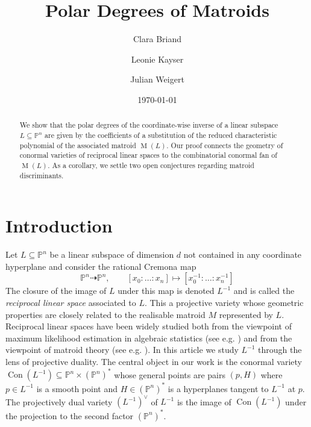 \documentclass[12pt,a4paper,english]{scrartcl}
\title{Polar Degrees of Matroids}
\author{Clara Briand}
\author{Leonie Kayser}
\author{Julian Weigert}
\date{\today}
\newcommand{\PP}{\mathbb{P}}
\DeclareMathOperator{\Matroid}{M}
\DeclareMathOperator{\Con}{Con}
\begin{document}
\maketitle

\begin{abstract}
We show that the polar degrees of the coordinate-wise inverse of a linear subspace $L \subseteq \PP^n$ are given by the coefficients of a substitution of the reduced characteristic polynomial of the associated matroid $\Matroid(L)$. Our proof connects the geometry of conormal varieties of reciprocal linear spaces to the combinatorial conormal fan of $\Matroid(L)$. As a corollary, we settle two open conjectures regarding matroid discriminants.
\end{abstract}

\tableofcontents


\section{Introduction}

Let $L\subseteq \PP^n$ be a linear subspace of dimension $d$ not contained in any coordinate hyperplane and consider the rational Cremona map
\[
\PP^n \dashrightarrow\PP^n, \qquad [x_0:\dots:x_n] \mapsto [x_0^{-1}:\dots:x_n^{-1}]
\]
The closure of the image of $L$ under this map is denoted $L^{-1}$ and is called the \emph{reciprocal linear space} associated to $L$. This a projective variety whose geometric properties are closely related to the realisable matroid $M$ represented by $L$. Reciprocal linear spaces have been widely studied both from the viewpoint of maximum likelihood estimation in algebraic statistics (see e.g. \cite{HuhSturmfels2014}) and from the viewpoint of matroid theory (see e.g. \cite{orlik1992arrangements,HuhKatz2012,Proudfoot2006}). In this article we study $L^{-1}$ through the lens of projective duality. The central object in our work is the conormal variety $\Con(L^{-1})\subseteq \PP^n\times (\PP^n)^*$ whose general points are pairs $(p,H)$ where $p\in L^{-1}$ is a smooth point and $H\in (\PP^n)^*$ is a hyperplanes tangent to $L^{-1}$ at $p$. The projectively dual variety $(L^{-1})^\vee$ of $L^{-1}$ is the image of $\Con(L^{-1})$ under the projection to the second factor $(\PP^n)^*$.
\end{document}

